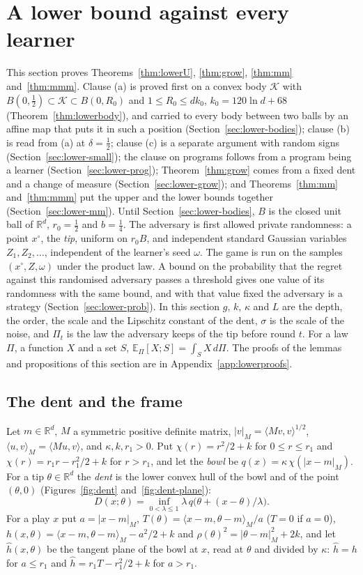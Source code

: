 \documentclass[11pt]{amsart}
\theoremstyle{definition}
\numberwithin{equation}{section}
\newcommand{\R}{\mathbb{R}}
\newcommand{\E}{\mathbb{E}}
\newcommand{\cK}{\mathcal{K}}
\newcommand{\ip}[1]{\langle #1\rangle}
\begin{document}
\section{A lower bound against every learner}\label{sec:lower}

This section proves Theorems~\ref{thm:lowerU}, \ref{thm:grow}, \ref{thm:mm} and~\ref{thm:mmm}. Clause (a) is proved first on a convex body $\cK$ with $B(0,\frac12)\subset\cK\subset B(0,R_0)$ and $1\le R_0\le dk_0$, $k_0=120\ln d+68$ (Theorem~\ref{thm:lowerbody}), and carried to every body between two balls by an affine map that puts it in such a position (Section~\ref{sec:lower-bodies}); clause (b) is read from (a) at $\delta=\frac12$; clause (c) is a separate argument with random signs (Section~\ref{sec:lower-small}); the clause on programs follows from a program being a learner (Section~\ref{sec:lower-prog}); Theorem~\ref{thm:grow} comes from a fixed dent and a change of measure (Section~\ref{sec:lower-grow}); and Theorems~\ref{thm:mm} and~\ref{thm:mmm} put the upper and the lower bounds together (Section~\ref{sec:lower-mm}). Until Section~\ref{sec:lower-bodies}, $B$ is the closed unit ball of $\R^d$, $r_0=\frac12$ and $b=\frac14$. The adversary is first allowed private randomness: a point $x^\circ$, the \emph{tip}, uniform on $r_0B$, and independent standard Gaussian variables $Z_1,Z_2,\dots$, independent of the learner's seed $\omega$. The game is run on the samples $(x^\circ,Z,\omega)$ under the product law. A bound on the probability that the regret against this randomised adversary passes a threshold gives one value of its randomness with the same bound, and with that value fixed the adversary is a strategy (Section~\ref{sec:lower-prob}). In this section $g$, $k$, $\kappa$ and $L$ are the depth, the order, the scale and the Lipschitz constant of the dent, $\sigma$ is the scale of the noise, and $\Pi_t$ is the law the adversary keeps of the tip before round $t$. For a law $\Pi$, a function $X$ and a set $S$, $\E_\Pi[X;S]=\int_SX\,d\Pi$. The proofs of the lemmas and propositions of this section are in Appendix~\ref{app:lowerproofs}.

\subsection{The dent and the frame}\label{sec:lower-dent}

Let $m\in\R^d$, $M$ a symmetric positive definite matrix, $|v|_M=\ip{Mv,v}^{1/2}$, $\ip{u,v}_M=\ip{Mu,v}$, and $\kappa,k,r_1>0$. Put $\chi(r)=r^2/2+k$ for $0\le r\le r_1$ and $\chi(r)=r_1r-r_1^2/2+k$ for $r>r_1$, and let the \emph{bowl} be $q(x)=\kappa\,\chi(|x-m|_M)$. For a tip $\theta\in\R^d$ the \emph{dent} is the lower convex hull of the bowl and of the point $(\theta,0)$ (Figures~\ref{fig:dent} and~\ref{fig:dent-plane}):
\[
D(x;\theta)=\inf_{0<\lambda\le1}\lambda\,q\bigl(\theta+(x-\theta)/\lambda\bigr).
\]
For a play $x$ put $a=|x-m|_M$, $T(\theta)=\ip{x-m,\theta-m}_M/a$ ($T=0$ if $a=0$), $h(x,\theta)=\ip{x-m,\theta-m}_M-a^2/2+k$ and $\rho(\theta)^2=|\theta-m|_M^2+2k$, and let $\hat h(x,\theta)$ be the tangent plane of the bowl at $x$, read at $\theta$ and divided by $\kappa$: $\hat h=h$ for $a\le r_1$ and $\hat h=r_1T-r_1^2/2+k$ for $a>r_1$.
\end{document}
